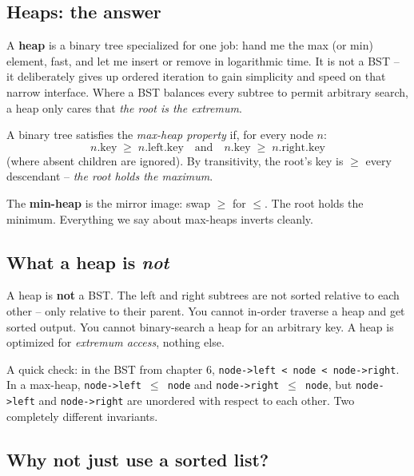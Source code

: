 \documentclass[11pt]{article}
\begin{document}
\subsection*{Heaps: the answer}

A \textbf{heap} is a binary tree specialized for one job: hand me the max (or min) element, fast, and let me insert or remove in logarithmic time. It is not a BST -- it deliberately gives up ordered iteration to gain simplicity and speed on that narrow interface. Where a BST balances every subtree to permit arbitrary search, a heap only cares that \emph{the root is the extremum}.

\begin{defnbox}
A binary tree satisfies the \emph{max-heap property} if, for every node $n$:
\[
n.\text{key} \;\ge\; n.\text{left}.\text{key}
\quad \text{and} \quad
n.\text{key} \;\ge\; n.\text{right}.\text{key}
\]
(where absent children are ignored). By transitivity, the root's key is $\ge$ every descendant -- \emph{the root holds the maximum}.
\end{defnbox}

The \textbf{min-heap} is the mirror image: swap $\ge$ for $\le$. The root holds the minimum. Everything we say about max-heaps inverts cleanly.

\subsection*{What a heap is \emph{not}}

\begin{warnbox}
A heap is \textbf{not} a BST. The left and right subtrees are not sorted relative to each other -- only relative to their parent. You cannot in-order traverse a heap and get sorted output. You cannot binary-search a heap for an arbitrary key. A heap is optimized for \emph{extremum access}, nothing else.
\end{warnbox}

A quick check: in the BST from chapter 6, \texttt{node->left < node < node->right}. In a max-heap, \texttt{node->left $\le$ node} and \texttt{node->right $\le$ node}, but \texttt{node->left} and \texttt{node->right} are unordered with respect to each other. Two completely different invariants.

\subsection*{Why not just use a sorted list?}
\end{document}
